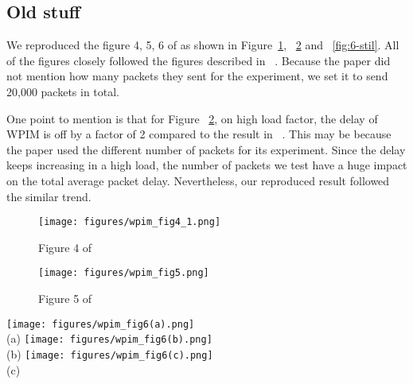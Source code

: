 
\subsection{Old stuff}
We reproduced the figure 4, 5, 6 of \cite{stiliadis} as shown in Figure~\ref{fig:4-stil}, ~\ref{fig:5-stil} and ~\ref{fig:6-stil}. All of the figures closely followed the figures described in ~\cite{stiliadis}. Because the paper did not mention how many packets they sent for the experiment, we set it to send 20,000 packets in total. 

One point to mention is that for Figure ~\ref{fig:5-stil}, on high load factor, the delay of WPIM is off by a factor of 2 compared to the result in ~\cite{stiliadis}. This may be because the paper used the different number of packets for its experiment. Since the delay keeps increasing in a high load, the number of packets we test have a huge impact on the total average packet delay. Nevertheless, our reproduced result followed the similar trend. 



\begin{figure}
    \centering
    \texttt{[image: figures/wpim\_fig4\_1.png]}
    \caption{Figure 4 of \cite{stiliadis}}
    \label{fig:4-stil}
\end{figure}

\begin{figure}
    \centering
    \texttt{[image: figures/wpim\_fig5.png]}
    \caption{Figure 5 of \cite{stiliadis}}
    \label{fig:5-stil}
\end{figure}

\begin{figure*}
    \centering
        \centering
        \texttt{[image: figures/wpim\_fig6(a).png]}\\
        (a)
    \endminipage\hfill
        \centering
        \texttt{[image: figures/wpim\_fig6(b).png]}\\
        (b)
    \endminipage\hfill
        \centering
        \texttt{[image: figures/wpim\_fig6(c).png]}\\
        (c)
    \endminipage
    \caption{Figure 6 of \cite{stiliadis}}
    \label{fig:6-stil}
\end{figure*}